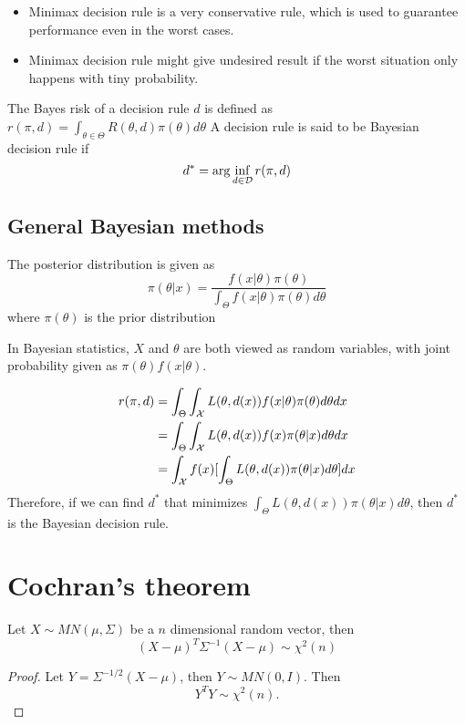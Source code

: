 \begin{refsection}
\begin{remark}\hfill
\begin{itemize}
    \item Minimax decision rule is a very conservative rule, which is used to guarantee performance even in the worst cases.
    \item Minimax decision rule might give undesired result if the worst situation only happens with tiny probability.
\end{itemize}
\end{remark}

\begin{definition}
\cite[10]{young2005essentials}
The Bayes risk of a decision rule $d$ is defined as
$r(\pi,d) = \int_{\theta \in \Theta} R(\theta,d) \pi(\theta) d\theta$
A decision rule is said to be Bayesian decision rule if
$$d^* = \arg\inf_{d\in \mathcal{D}} r(\pi,d)$$
\end{definition}


\subsection{General Bayesian methods}
\begin{definition}
The posterior distribution is given as
$$\pi(\theta|x) = \frac{f(x|\theta)\pi(\theta)}{\int_{\Theta}f(x|\theta)\pi(\theta)d\theta}$$
where $\pi(\theta)$ is the prior distribution
\end{definition}

\begin{remark}
In Bayesian statistics, $X$ and $\theta$ are both viewed as random variables, with joint probability given as $\pi(\theta)f(x|\theta)$.
\end{remark}


\begin{align*}
    r(\pi,d) &=\int_{\Theta} \int_{\mathcal{X}}L(\theta,d(x))f(x|\theta)\pi(\theta)d\theta dx\\
    &= \int_{\Theta} \int_{\mathcal{X}}L(\theta,d(x))f(x)\pi(\theta|x)d\theta dx \\
    &= \int_{\mathcal{X}}f(x) [\int_{\Theta}L(\theta,d(x))\pi(\theta|x)d\theta] dx
\end{align*}
Therefore, if we can find $d^*$ that minimizes $\int_{\Theta}L(\theta,d(x))\pi(\theta|x)d\theta$, then $d^*$ is the Bayesian decision rule. 




\section{Cochran's theorem}
\begin{lemma}
	Let $X\sim MN(\mu,\Sigma)$ be a $n$ dimensional random vector, then
	$$(X-\mu)^T\Sigma^{-1}(X-\mu) \sim \chi^2(n)$$
\end{lemma}
\begin{proof}
	Let $Y = \Sigma^{-1/2}(X-\mu)$, then $Y\sim MN(0,I)$. Then $$Y^TY \sim \chi^2(n).$$
\end{proof}


\end{refsection}
